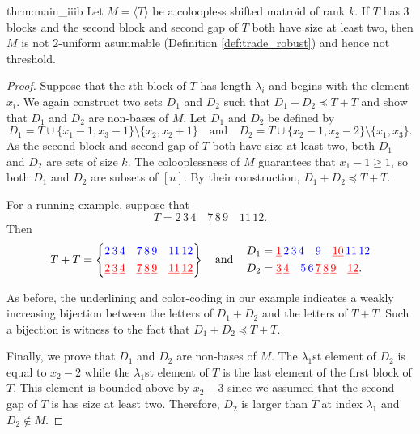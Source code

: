 \documentclass[10pt,a4paper]{amsart}
\theoremstyle{definition}
\theoremstyle{plain}
\begin{document}
\begin{repdoubletheorem}{thrm:main_iiib}
\label{prop:3blocks}
Let $M=\langle T\rangle$ be a coloopless shifted matroid of rank $k$. If $T$ has $3$ blocks and the second block and second gap of $T$ both have size at least two, then $M$ is not $2$-uniform asummable (Definition \ref{def:trade_robust}) and hence not threshold. 
\end{repdoubletheorem}
\begin{proof}
  Suppose that the $i$th block of $T$ has length $\lambda_i$ and begins with the element $x_i$. We again construct two sets $D_1$ and $D_2$ such that $D_1+D_2\preceq T+T$ and show that $D_1$ and $D_2$ are non-bases of $M$. Let $D_1$ and $D_2$ be defined by
  \[D_1 = T\cup \{x_1-1,x_3-1\}\setminus \{x_2,x_2+1\} \quad\text{and}\quad D_2 = T\cup \{x_2-1,x_2-2\}\setminus \{x_1,x_3\}. \]
As the second block and second gap of $T$ both have size at least two, both $D_1$ and $D_2$ are sets of size $k$. The colooplessness of $M$ guarantees that $x_1-1\geq 1$, so both $D_1$ and $D_2$ are subsets of $[n]$. By their construction, $D_1+D_2 \preceq T+T$.

  For a running example, suppose that 
\[ T = 2\,3\,4\quad 7\,8\,9\quad 11\,12.\]
Then
\[
T+T = \left\{ \begin{aligned} {\color{blue}2\,3\,4\quad 7\,8\,9\quad 11\,12}\\
\underline{\color{red}2}\,\underline{\color{red}3}\,\underline{\color{red}4}\quad \underline{\color{red}7}\,\underline{\color{red}8}\,\underline{\color{red}9}\quad \underline{\color{red}11}\,\underline{\color{red}12}\end{aligned}\right\} \quad \text{and}\,\quad
{\begin{aligned}
&D_1 = \underline{\color{red}1}\,{\color{blue} 2\, 3\, 4\quad 9}\quad \underline{\color{red}10}\,  {\color{blue}11\,12}\\
&D_2 = \underline{\color{red}3}\, \underline{\color{red}4}\quad {\color{blue}5\, 6}\, \underline{\color{red}7}\,  \underline{\color{red}8}\, \underline{\color{red}9}\quad \underline{\color{red}12}.
\end{aligned}}
\]

As before, the underlining and color-coding in our example indicates a weakly increasing bijection between the letters of $D_1+D_2$ and the letters of $T+T$. Such a bijection is witness to the fact that $D_1+D_2 \preceq T+T$.

Finally, we prove that $D_1$ and $D_2$ are non-bases of $M$. The $\lambda_1$st element of $D_2$ is equal to $x_2-2$ while the $\lambda_1$st element of $T$ is the last element of the first block of $T$. This element is bounded above by $x_2-3$ since we assumed that the second gap of $T$ is has size at least two. Therefore, $D_2$ is larger than $T$ at index $\lambda_1$ and $D_2\not\in M$.


\end{proof}
\end{document}
